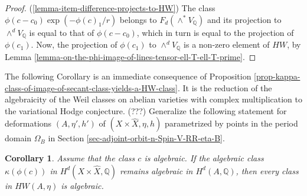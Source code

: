 \documentclass[12pt]{amsart}
\newcommand{\hide}[1]{}
\numberwithin{equation}{subsection}
\theoremstyle{plain}
\newtheorem{cor}[thm]{Corollary}
\newtheorem{lem}[thm]{Lemma}
\theoremstyle{definition}
\newcommand{\QQ}{{\mathbb Q}}
\newcommand{\R}{{\mathcal R}}
\begin{document}
{\begin{proof}
(\ref{lemma-item-difference-projects-to-HW})
The class $\phi(c-c_0)\exp\left(-\phi(c)_1/r\right)$ belongs to $F_d(\wedge^*V_\QQ)$
and its projection to $\wedge^dV_\QQ$ is equal to that of $\phi(c-c_0)$, which in turn is equal to the projection of $\phi(c_1)$. 
Now, the projection of $\phi(c_1)$ to $\wedge^dV_\QQ$ is a non-zero element of $HW$, by Lemma \ref{lemma-on-the-phi-image-of-lines-tensor-ell-T-ell-T-prime}.
\end{proof}

The following Corollary is an immediate consequence of Proposition \ref{prop-kappa-class-of-image-of-secant-class-yields-a-HW-class}. It is the reduction of the algebraicity of the Weil classes on abelian varieties with complex multiplication to the variational Hodge conjecture. 
(???) Generalize the following statement for deformations $(A,\eta',h')$ of $(X\times\hat{X},\eta,h)$ parametrized by points in the period domain $\Omega_B$  in Section 
\ref{sec-adjoint-orbit-n-Spin-V-RR-eta-B}. 

\begin{cor}
Assume that the class $c$ is algebraic. 
If the algebraic class $\kappa(\phi(c))$ in $H^d(X\times\hat{X},\QQ)$ remains algebraic in $H^d(A,\QQ)$, then every class in $HW(A,\eta)$ is algebraic.
\end{cor}




\hide{
Let $c$ be a class in $B\otimes_\QQ B$. 
Write
$c=\sum_i c_i$, with $c_i$ in $BB_i$ and assume that $c_1$ does not belong to $KB_1$.

\begin{lem}
There exists a class $\delta\in \R$, such that 
$\tilde{\varphi}(c)-\delta$ belongs to $F^{d(e-1)}(\wedge^*V_\QQ)$ and its projection to $\wedge^{d(e-1)}V_\QQ$ is a non-zero class in 
$\langle HW\rangle_{d(e-1)}$. 
\end{lem}

}}
\end{document}
